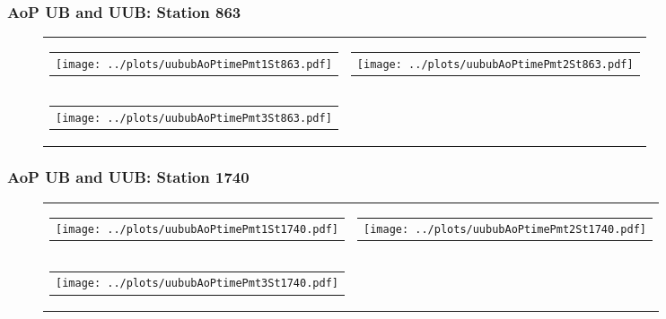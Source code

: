 \documentclass[aspectratio=169]{beamer}
\begin{document}
\begin{frame}
  \frametitle{AoP UB and UUB: Station 863}
  \begin{figure}
    \centering
    \begin{tabularx}{\textwidth}{CC}
      \begin{tabular}{l}
        \texttt{[image: ../plots/uububAoPtimePmt1St863.pdf]}
      \end{tabular}
      &
      \begin{tabular}{l}
        \texttt{[image: ../plots/uububAoPtimePmt2St863.pdf]}
      \end{tabular}
      \\
      \begin{tabular}{l}
        \texttt{[image: ../plots/uububAoPtimePmt3St863.pdf]}
      \end{tabular}
    \end{tabularx}
  \end{figure}
\end{frame}


\begin{frame}
  \frametitle{AoP UB and UUB: Station 1740}
  \begin{figure}
    \centering
    \begin{tabularx}{\textwidth}{CC}
      \begin{tabular}{l}
        \texttt{[image: ../plots/uububAoPtimePmt1St1740.pdf]}
      \end{tabular}
      &
      \begin{tabular}{l}
        \texttt{[image: ../plots/uububAoPtimePmt2St1740.pdf]}
      \end{tabular}
      \\
      \begin{tabular}{l}
        \texttt{[image: ../plots/uububAoPtimePmt3St1740.pdf]}
      \end{tabular}
    \end{tabularx}
  \end{figure}
\end{frame}
\end{document}
